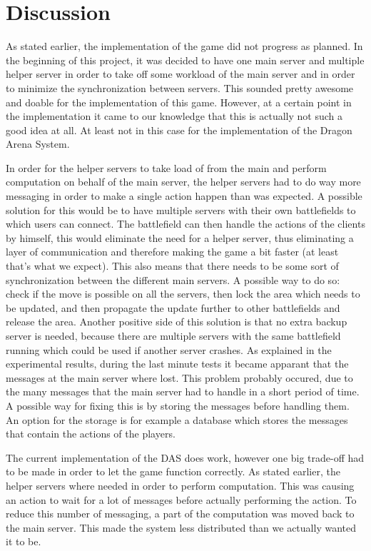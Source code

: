 \section{Discussion}
As stated earlier, the implementation of the game did not progress as planned.
In the beginning of this project, it was decided to have one main server and multiple helper server in order to take off some workload of the main server and in order to minimize the synchronization between servers.
This sounded pretty awesome and doable for the implementation of this game.
However, at a certain point in the implementation it came to our knowledge that this is actually not such a good idea at all.
At least not in this case for the implementation of the Dragon Arena System.

In order for the helper servers to take load of from the main and perform computation on behalf of the main server, the helper servers had to do way more messaging in order to make a single action happen than was expected.
A possible solution for this would be to have multiple servers with their own battlefields to which users can connect.
The battlefield can then handle the actions of the clients by himself, this would eliminate the need for a helper server, thus eliminating a layer of communication and therefore making the game a bit faster (at least that's what we expect). 
This also means that there needs to be some sort of synchronization between the different main servers.
A possible way to do so: check if the move is possible on all the servers, then lock the area which needs to be updated, and then propagate the update further to other battlefields and release the area.
Another positive side of this solution is that no extra backup server is needed, because there are multiple servers with the same battlefield running which could be used if another server crashes.
As explained in the experimental results, during the last minute tests it became apparant that the messages at the main server where lost. 
This problem probably occured, due to the many messages that the main server had to handle in a short period of time. A possible way for fixing this is by storing the messages before handling them. An option for the storage is for example a database which stores the messages that contain the actions of the players.

The current implementation of the DAS does work, however one big trade-off had to be made in order to let the game function correctly.
As stated earlier, the helper servers where needed in order to perform computation. 
This was causing an action to wait for a lot of messages before actually performing the action.
To reduce this number of messaging, a part of the computation was moved back to the main server.
This made the system less distributed than we actually wanted it to be.

